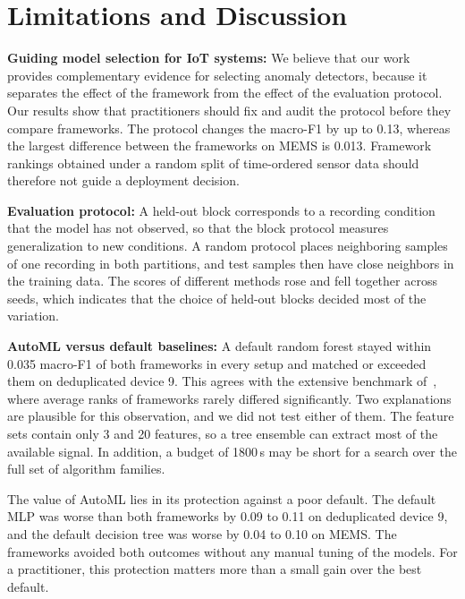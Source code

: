 \section{Limitations and Discussion}\label{sec:discussion}
\textbf{Guiding model selection for IoT systems:} We believe that our work provides complementary evidence for selecting anomaly detectors, because it separates the effect of the framework from the effect of the evaluation protocol. Our results show that practitioners should fix and audit the protocol before they compare frameworks. The protocol changes the macro-F1 by up to 0.13, whereas the largest difference between the frameworks on MEMS is 0.013. Framework rankings obtained under a random split of time-ordered sensor data should therefore not guide a deployment decision.

\textbf{Evaluation protocol:} A held-out block corresponds to a recording condition that the model has not observed, so that the block protocol measures generalization to new conditions. A random protocol places neighboring samples of one recording in both partitions, and test samples then have close neighbors in the training data. The scores of different methods rose and fell together across seeds, which indicates that the choice of held-out blocks decided most of the variation.

\textbf{AutoML versus default baselines:} A default random forest stayed within 0.035 macro-F1 of both frameworks in every setup and matched or exceeded them on deduplicated device 9. This agrees with the extensive benchmark of~\cite{gijsbers2022}, where average ranks of frameworks rarely differed significantly. Two explanations are plausible for this observation, and we did not test either of them. The feature sets contain only 3 and 20 features, so a tree ensemble can extract most of the available signal. In addition, a budget of 1800\,s may be short for a search over the full set of algorithm families.

The value of AutoML lies in its protection against a poor default. The default MLP was worse than both frameworks by 0.09 to 0.11 on deduplicated device 9, and the default decision tree was worse by 0.04 to 0.10 on MEMS. The frameworks avoided both outcomes without any manual tuning of the models. For a practitioner, this protection matters more than a small gain over the best default.

